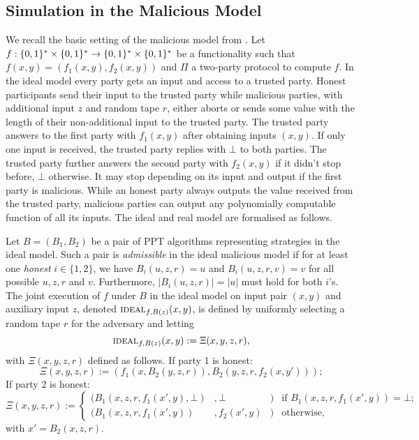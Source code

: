 \subsection{Simulation in the Malicious Model}\label{app:simulation}
We recall the basic setting of the malicious model from \cite{Goldreich2004}.
Let $f:\{0,1\}^\ast \times \{0,1\}^\ast \rightarrow \{0,1\}^\ast \times \{0,1\}^\ast$ be a functionality such that $f(x,y)=(f_1(x, y), f_2(x,y))$ and $\Pi$ a two-party protocol to compute $f$.
In the ideal model every party gets an input and access to a trusted party.
Honest participants send their input to the trusted party while malicious parties, with additional input $z$ and random tape $r$, either aborts or sends some value with the length of their non-additional input to the trusted party.
The trusted party answers to the first party with $f_1(x, y)$ after obtaining inputs $(x,y)$.
If only one input is received, the trusted party replies with $\bot$ to both parties.
The trusted party further answers the second party with $f_2(x,y)$ if it didn't stop before, $\bot$ otherwise.
It may stop depending on its input and output if the first party is malicious.
While an honest party always outputs the value received from the trusted party, malicious parties can output any polynomially computable function of all its inputs.
The ideal and real model are formalised as follows.

\begin{definition}
Let $B=(B_1, B_2)$ be a pair of PPT algorithms representing strategies in the ideal model.
Such a pair is \emph{admissible} in the ideal malicious model if for at least one \emph{honest} $i\in\{1,2\}$, we have $B_i(u, z, r)=u$ and $B_i(u, z, r, v)=v$ for all possible $u,z,r$ and $v$.
Furthermore, $|B_i(u, z, r)| = |u|$ must hold for both $i$'s.
The joint execution of $f$ under $B$ in the ideal model on input pair $(x, y)$ and auxiliary input $z$, denoted $\IDEAL_{f, B(z)} (x, y)$, is defined by uniformly selecting a random tape $r$ for the adversary and letting 
\[ \IDEAL_{f, B(z)} (x, y) := \Xi(x,y,z,r),\]
with $\Xi(x,y,z,r)$ defined as follows.
If party 1 is honest:
\[ \Xi(x,y,z,r) := (f_1(x,B_2(y,z,r)), B_2(y,z,r,f_2(x,y'))); \]
If party 2 is honest:
\[
 \Xi(x,y,z,r) := \left\{
 \begin{array}{lllr}
    (B_1(x, z, r, f_1(x',y), \bot)&, \bot&) &\text{if } B_1(x, z, r, f_1(x',y)) = \bot ;\\
    (B_1(x,z,r,f_1(x',y))&, f_2(x',y)&) &\text{otherwise,}
  \end{array}\right.
\]
with $x'=B_2(x,z,r)$.
\end{definition}

